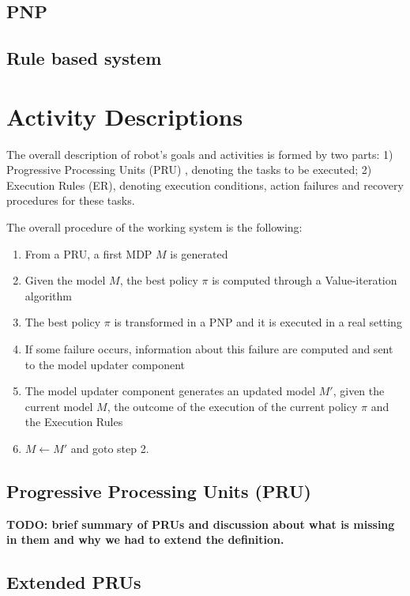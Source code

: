 \subsection{PNP}

\subsection{Rule based system}

\section{Activity Descriptions}

The overall description of robot's goals and activities is formed by two parts:
1) Progressive Processing Units (PRU) \cite{CaMoZi01}, denoting the tasks to be executed;
2) Execution Rules (ER), denoting execution conditions, action failures and recovery procedures for these tasks.

The overall procedure of the working system is the following:
\begin{enumerate}
\item From a PRU, a first MDP $M$ is generated 
\item Given the model $M$, the best policy $\pi$ is computed through a Value-iteration algorithm
\item The best policy $\pi$ is transformed in a PNP and it is executed in a real setting
\item If some failure occurs, information about this failure are computed and sent to the model updater component
\item The model updater component generates an updated model $M'$, given the current model $M$, the outcome of the execution of the current policy $\pi$ and the Execution Rules
\item $M \leftarrow M'$ and goto step 2. 
\end{enumerate}



\subsection{Progressive Processing Units (PRU)}

{\bf TODO: brief summary of PRUs and discussion about what is missing in them and why we had to extend the definition.}


\subsection{Extended PRUs}

